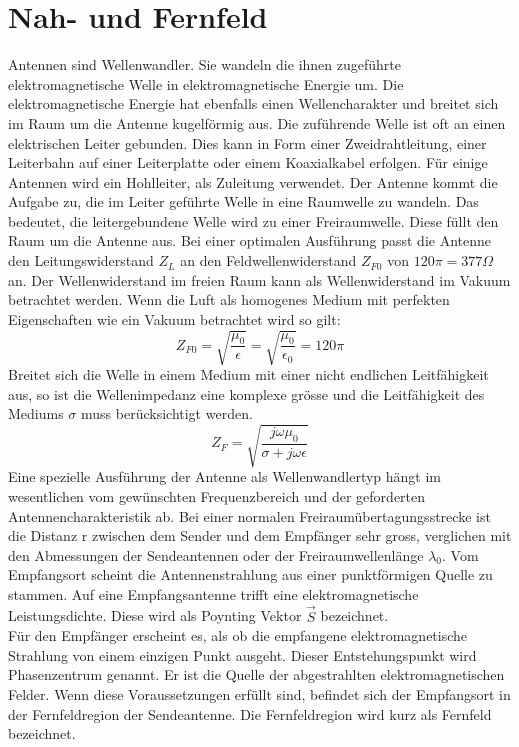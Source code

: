 \newpage
\section{Nah- und Fernfeld}\label{sec:NahundFern}
Antennen sind Wellenwandler. Sie wandeln die ihnen zugeführte elektromagnetische Welle in  elektromagnetische Energie um. Die elektromagnetische Energie hat ebenfalls einen Wellencharakter und breitet  sich im Raum um die Antenne kugelförmig aus. Die zuführende Welle ist oft an einen elektrischen Leiter gebunden. Dies kann in Form einer Zweidrahtleitung, einer Leiterbahn auf einer Leiterplatte oder einem Koaxialkabel erfolgen.  Für einige Antennen wird ein Hohlleiter, als Zuleitung verwendet. 
Der Antenne kommt die Aufgabe zu, die im Leiter geführte Welle in eine Raumwelle zu wandeln. Das bedeutet, die leitergebundene Welle wird zu einer Freiraumwelle. Diese füllt den Raum um die Antenne aus. 
Bei einer optimalen Ausführung passt die Antenne den Leitungswiderstand $Z_{L}$ an den Feldwellenwiderstand $Z_{F0}$ von $120\pi = 377 \Omega$ an. Der Wellenwiderstand im freien Raum kann als Wellenwiderstand im Vakuum betrachtet werden. Wenn die Luft als homogenes Medium mit perfekten Eigenschaften wie ein Vakuum betrachtet wird so gilt:
\begin{equation}\label{eq:Wellenimpedanz}
Z_{F0}=\sqrt{\dfrac{\mu_{0}}{\epsilon}}=\sqrt{\dfrac{\mu_{0}}{\epsilon_{0}}}=120\pi
\end{equation}
Breitet sich die Welle in einem Medium mit einer nicht endlichen Leitfähigkeit aus, so ist die Wellenimpedanz eine komplexe grösse und die Leitfähigkeit des Mediums $\sigma$ muss berücksichtigt werden.
\begin{equation}\label{eq:Wellenimpedanz_Leitung}
Z_{F}=\sqrt{\dfrac{j\omega\mu_{0}}{\sigma+j\omega\epsilon}}
\end{equation}
Eine spezielle Ausführung der Antenne als Wellenwandlertyp hängt im wesentlichen vom gewünschten Frequenzbereich und der geforderten Antennencharakteristik ab. Bei einer normalen Freiraumübertagungsstrecke ist die Distanz r zwischen dem Sender und dem Empfänger sehr gross, verglichen mit den Abmessungen der Sendeantennen oder der Freiraumwellenlänge $\lambda_{0}$. Vom Empfangsort scheint die Antennenstrahlung  aus einer punktförmigen Quelle zu stammen. Auf eine Empfangsantenne trifft eine  elektromagnetische Leistungsdichte. Diese wird als Poynting Vektor $\vec{S}$ bezeichnet.\\
Für den Empfänger erscheint es, als ob die empfangene elektromagnetische Strahlung von einem einzigen Punkt ausgeht. Dieser Entstehungspunkt wird Phasenzentrum genannt. Er ist die Quelle der abgestrahlten elektromagnetischen Felder. Wenn diese Voraussetzungen erfüllt sind, befindet sich der Empfangsort in der Fernfeldregion der Sendeantenne. Die Fernfeldregion wird kurz als Fernfeld bezeichnet. 
